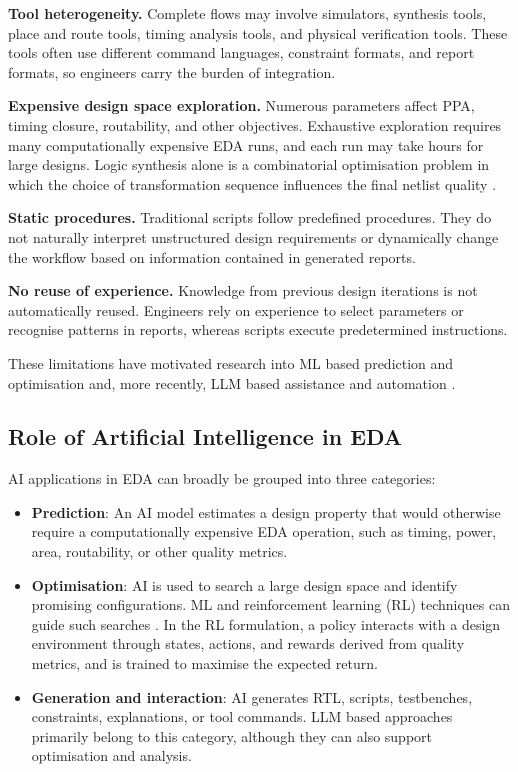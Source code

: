 \documentclass[conference]{IEEEtran}
\begin{document}
\noindent \textbf{Tool heterogeneity.} Complete flows may involve simulators, synthesis tools, place and route tools, timing analysis tools, and physical verification tools. These tools often use different command languages, constraint formats, and report formats, so engineers carry the burden of integration.

\noindent \textbf{Expensive design space exploration.} Numerous parameters affect PPA, timing closure, routability, and other objectives. Exhaustive exploration requires many computationally expensive EDA runs, and each run may take hours for large designs. Logic synthesis alone is a combinatorial optimisation problem in which the choice of transformation sequence influences the final netlist quality \cite{P9_Chowdhury2021}.

\noindent \textbf{Static procedures.} Traditional scripts follow predefined procedures. They do not naturally interpret unstructured design requirements or dynamically change the workflow based on information contained in generated reports.

\noindent \textbf{No reuse of experience.} Knowledge from previous design iterations is not automatically reused. Engineers rely on experience to select parameters or recognise patterns in reports, whereas scripts execute predetermined instructions.

\noindent These limitations have motivated research into ML based prediction and optimisation and, more recently, LLM based assistance and automation \cite{P1_Huang2021,P2_Chen2023,P6_Pan2025}.

\subsection{Role of Artificial Intelligence in EDA} \label{B3}

\noindent AI applications in EDA can broadly be grouped into three categories: 
\begin{itemize}
    \item \textbf{Prediction}: An AI model estimates a design property that would otherwise require a computationally expensive EDA operation, such as timing, power, area, routability, or other quality metrics. \\

    \item \textbf{Optimisation}: AI is used to search a large design space and identify promising configurations. ML and reinforcement learning (RL) techniques can guide such searches \cite{P1_Huang2021,P2_Chen2023}. In the RL formulation, a policy interacts with a design environment through states, actions, and rewards derived from quality metrics, and is trained to maximise the expected return.\\
    
    \item \textbf{Generation and interaction}: AI generates RTL, scripts, testbenches, constraints, explanations, or tool commands. LLM based approaches primarily belong to this category, although they can also support optimisation and analysis.\\
\end{itemize}
\end{document}
